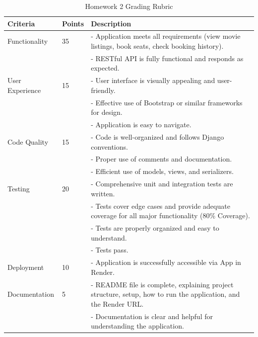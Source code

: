 \documentclass{article}
\begin{document}
\begin{table}[ht]
\centering
\small
\begin{tabular}{l l p{8cm}}
\hline
\textbf{Criteria} & \textbf{Points} & \textbf{Description} \\
\hline
Functionality &
35 &
- Application meets all requirements (view movie listings, book seats, check booking history).\\
& &
- RESTful API is fully functional and responds as expected. \newline \\
User Experience &
15 &
- User interface is visually appealing and user-friendly.\\
& &
- Effective use of Bootstrap or similar frameworks for design.\\
& &
- Application is easy to navigate. \newline \\
Code Quality &
15 &
- Code is well-organized and follows Django conventions. \\
& &
- Proper use of comments and documentation. \\
& &
- Efficient use of models, views, and serializers. \newline \\
Testing &
20 &
- Comprehensive unit and integration tests are written.\\
& &
- Tests cover edge cases and provide adequate coverage for all major functionality (80\%  Coverage).\\
& &
- Tests are properly organized and easy to understand. \\
& & 
- Tests pass. \newline \\

Deployment &
10 &
- Application is successfully accessible via App in Render. \newline \\ 
Documentation &
5 &
- README file is complete, explaining project structure, setup, how to run the application, and the Render URL.\\
& &
- Documentation is clear and helpful for understanding the application.\\
\hline
\end{tabular}
\caption{Homework 2 Grading Rubric}
\end{table}
\end{document}
